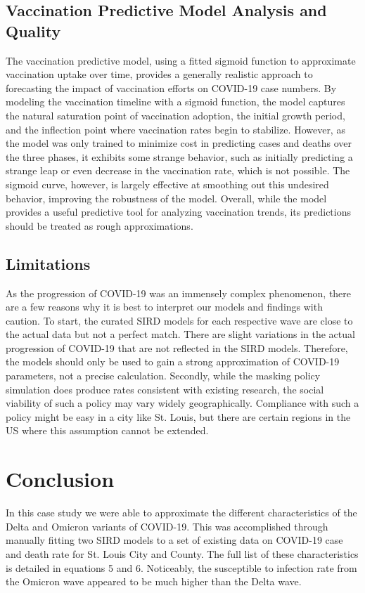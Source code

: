 \documentclass[conference]{IEEEtran}
\begin{document}
\subsection{Vaccination Predictive Model Analysis and Quality}
The vaccination predictive model, using a fitted sigmoid function to approximate vaccination uptake over time, provides a generally realistic approach to forecasting the impact of vaccination efforts on COVID-19 case numbers. By modeling the vaccination timeline with a sigmoid function, the model captures the natural saturation point of vaccination adoption, the initial growth period, and the inflection point where vaccination rates begin to stabilize. However, as the model was only trained to minimize cost in predicting cases and deaths over the three phases, it exhibits some strange behavior, such as initially predicting a strange leap or even decrease in the vaccination rate, which is not possible. The sigmoid curve, however, is largely effective at smoothing out this undesired behavior, improving the robustness of the model. Overall, while the model provides a useful predictive tool for analyzing vaccination trends, its predictions should be treated as rough approximations.

\subsection{Limitations}
As the progression of COVID-19 was an immensely complex phenomenon, there are a few reasons why it is best to interpret our models and findings with caution. To start, the curated SIRD models for each respective wave are close to the actual data but not a perfect match. There are slight variations in the actual progression of COVID-19 that are not reflected in the SIRD models. Therefore, the models should only be used to gain a strong approximation of COVID-19 parameters, not a precise calculation. Secondly, while the masking policy simulation does produce rates consistent with existing research, the social viability of such a policy may vary widely geographically. Compliance with such a policy might be easy in a city like St. Louis, but there are certain regions in the US where this assumption cannot be extended.

\section{Conclusion}
In this case study we were able to approximate the different characteristics of the Delta and Omicron variants of COVID-19. This was accomplished through manually fitting two SIRD models to a set of existing data on COVID-19 case and death rate for St. Louis City and County. The full list of these characteristics is detailed in equations 5 and 6. Noticeably, the susceptible to infection rate from the Omicron wave appeared to be much higher than the Delta wave. 
\end{document}

